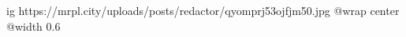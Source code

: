  
 
 
 
 

\ifcmt
  ig https://mrpl.city/uploads/posts/redactor/qyomprj53ojfjm50.jpg
  @wrap center
  @width 0.6
\fi
